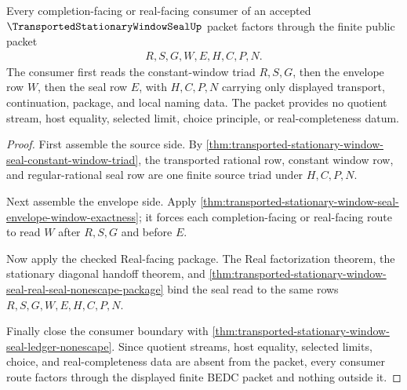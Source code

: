 \begin{theorem}
\label{thm:transported-stationary-window-seal-completion-consumer-boundary}
Every completion-facing or real-facing consumer of an accepted $\TransportedStationaryWindowSealUp$ packet factors through the finite public packet
$$
\begin{aligned}
  R,S,G,W,E,H,C,P,N .
\end{aligned}
$$
The consumer first reads the constant-window triad $R,S,G$, then the envelope row $W$, then the seal row $E$, with $H,C,P,N$ carrying only displayed transport, continuation, package, and local naming data. The packet provides no quotient stream, host equality, selected limit, choice principle, or real-completeness datum.
\end{theorem}
\begin{proof}
First assemble the source side. By \autoref{thm:transported-stationary-window-seal-constant-window-triad}, the transported rational row, constant window row, and regular-rational seal row are one finite source triad under $H,C,P,N$.

Next assemble the envelope side. Apply \autoref{thm:transported-stationary-window-seal-envelope-window-exactness}; it forces each completion-facing or real-facing route to read $W$ after $R,S,G$ and before $E$.

Now apply the checked Real-facing package. The Real factorization theorem, the stationary diagonal handoff theorem, and \autoref{thm:transported-stationary-window-seal-real-seal-nonescape-package} bind the seal read to the same rows $R,S,G,W,E,H,C,P,N$.

Finally close the consumer boundary with \autoref{thm:transported-stationary-window-seal-ledger-nonescape}. Since quotient streams, host equality, selected limits, choice, and real-completeness data are absent from the packet, every consumer route factors through the displayed finite BEDC packet and nothing outside it.
\end{proof}

